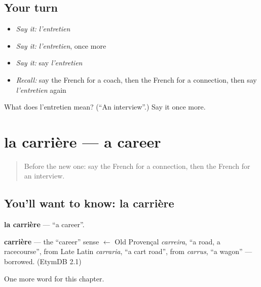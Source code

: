\subsection*{Your turn}
\begin{itemize}
\raggedright
  \item \emph{Say it:} \emph{l'entretien}
  \item \emph{Say it:} \emph{l'entretien}, once more
  \item \emph{Say it:} say \emph{l'entretien}
  \item \emph{Recall:} say the French for a coach, then the French for a connection, then say \emph{l'entretien} again
\end{itemize}

\begin{tcolorbox}[breakable,colback=teal!4,colframe=teal!35!black,title={Before you move on}]
What does l'entretien mean? (\textquotedblleft{}An interview\textquotedblright{}.) Say it once more.
\end{tcolorbox}
\section[la carrière]{la carrière — a career}

\label{lesson:FR-C204-carriere}



\begin{quote}
Before the new one: say the French for a connection, then the French for an interview.
\end{quote}

\subsection*{You'll want to know: la carrière}
\textbf{la carrière} — \textquotedblleft{}a career\textquotedblright{}.

\begin{cousinweb}
\textbf{carrière} — the \textquotedblleft{}career\textquotedblright{} sense $\leftarrow$ Old Provençal \emph{carreira}, \textquotedblleft{}a road, a racecourse\textquotedblright{}, from Late Latin \emph{carraria}, \textquotedblleft{}a cart road\textquotedblright{}, from \emph{carrus}, \textquotedblleft{}a wagon\textquotedblright{} — borrowed. (EtymDB 2.1)
\end{cousinweb}

\begin{grammarlens}[title={What you've built}]
One more word for this chapter.
\end{grammarlens}

